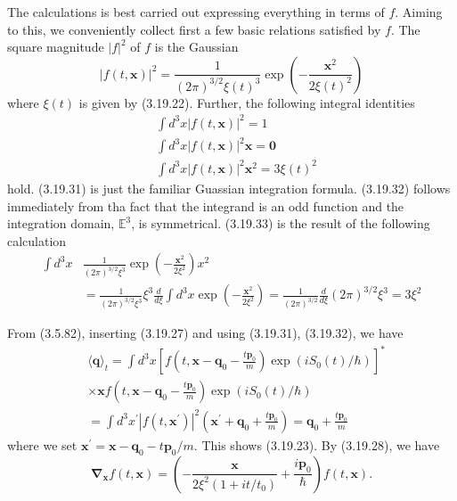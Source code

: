 \documentclass{article}
\begin{document}
The calculations is best carried out expressing everything in terms of $f$. Aiming to this, we conveniently collect first a few basic relations satisfied by $f$. The square magnitude $|f|^{2}$ of $f$ is the Gaussian
$$
\begin{equation*}
|f(t, \boldsymbol{x})|^{2}=\frac{1}{(2 \pi)^{3 / 2} \xi(t)^{3}} \exp \left(-\frac{\boldsymbol{x}^{2}}{2 \xi(t)^{2}}\right) \tag{3.19.30}
\end{equation*}
$$
where $\xi(t)$ is given by (3.19.22). Further, the following integral identities
$$
\begin{align*}
& \int d^{3} x|f(t, \boldsymbol{x})|^{2}=1  \tag{3.19.31}\\
& \int d^{3} x|f(t, \boldsymbol{x})|^{2} \boldsymbol{x}=\mathbf{0}  \tag{3.19.32}\\
& \int d^{3} x|f(t, \boldsymbol{x})|^{2} \boldsymbol{x}^{2}=3 \xi(t)^{2} \tag{3.19.33}
\end{align*}
$$
hold. (3.19.31) is just the familiar Guassian integration formula. (3.19.32) follows immediately from tha fact that the integrand is an odd function and the integration domain, $\mathbb{E}^{3}$, is symmetrical. (3.19.33) is the result of the following calculation
$$
\begin{align*}
\int d^{3} x & \frac{1}{(2 \pi)^{3 / 2} \xi^{3}} \exp \left(-\frac{\boldsymbol{x}^{2}}{2 \xi^{2}}\right) x^{2}  \tag{3.19.34}\\
& =\frac{1}{(2 \pi)^{3 / 2} \xi^{3}} \xi^{3} \frac{d}{d \xi} \int d^{3} x \exp \left(-\frac{\boldsymbol{x}^{2}}{2 \xi^{2}}\right)=\frac{1}{(2 \pi)^{3 / 2}} \frac{d}{d \xi}(2 \pi)^{3 / 2} \xi^{3}=3 \xi^{2}
\end{align*}
$$

From (3.5.82), inserting (3.19.27) and using (3.19.31), (3.19.32), we have
$$
\begin{align*}
&\langle\boldsymbol{q}\rangle_{t}= \int d^{3} x\left[f\left(t, \boldsymbol{x}-\boldsymbol{q}_{0}-\frac{t \boldsymbol{p}_{0}}{m}\right) \exp \left(i S_{0}(t) / \hbar\right)\right]^{*}  \tag{3.19.35}\\
& \times \boldsymbol{x} f\left(t, \boldsymbol{x}-\boldsymbol{q}_{0}-\frac{t \boldsymbol{p}_{0}}{m}\right) \exp \left(i S_{0}(t) / \hbar\right) \\
&=\int d^{3} x^{\prime}\left|f\left(t, \boldsymbol{x}^{\prime}\right)\right|^{2}\left(\boldsymbol{x}^{\prime}+\boldsymbol{q}_{0}+\frac{t \boldsymbol{p}_{0}}{m}\right)=\boldsymbol{q}_{0}+\frac{t \boldsymbol{p}_{0}}{m}
\end{align*}
$$
where we set $\boldsymbol{x}^{\prime}=\boldsymbol{x}-\boldsymbol{q}_{0}-t \boldsymbol{p}_{0} / m$. This shows (3.19.23).
By (3.19.28), we have
$$
\begin{equation*}
\boldsymbol{\nabla}_{\boldsymbol{x}} f(t, \boldsymbol{x})=\left(-\frac{\boldsymbol{x}}{2 \xi^{2}\left(1+i t / t_{0}\right)}+\frac{i \boldsymbol{p}_{0}}{\hbar}\right) f(t, \boldsymbol{x}) . \tag{3.19.36}
\end{equation*}
$$
\end{document}
